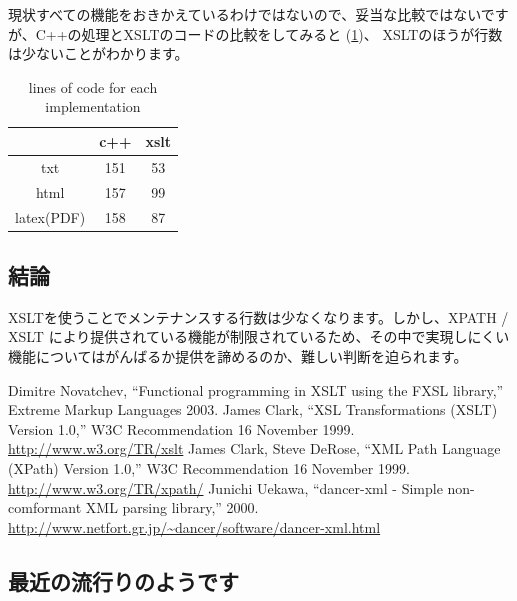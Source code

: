 \documentclass[mingoth,a4paper]{jsarticle}
\begin{document}
現状すべての機能をおきかえているわけではないので、妥当な比較ではないです
が、C++の処理とXSLTのコードの比較をしてみると
(\ref{tab:xsltcxximplementationdiff})、
XSLTのほうが行数は少ないことがわかります。

\begin{table}[ht]
 \caption{lines of code for each implementation}
 \label{tab:xsltcxximplementationdiff}
\begin{center}
  \begin{tabular}{|c|c|c|}
 \hline
 & c++ & xslt \\
 \hline
 txt & 151 & 53\\
 html & 157 & 99 \\
 latex(PDF) & 158 & 87 \\
 \hline
 \end{tabular}
\end{center}
\end{table}

\subsection{結論}

XSLTを使うことでメンテナンスする行数は少なくなります。しかし、XPATH /
XSLT により提供されている機能が制限されているため、その中で実現しにくい
機能についてはがんばるか提供を諦めるのか、難しい判断を迫られます。

\begin{thebibliography}{0}
  Dimitre Novatchev, ``Functional programming in XSLT
	 using the FXSL library,'' Extreme Markup Languages 2003.
  James Clark, ``XSL Transformations (XSLT)
	 Version 1.0,'' W3C Recommendation 16 November 1999.
	 \url{http://www.w3.org/TR/xslt}
  James Clark, Steve DeRose, ``XML Path Language
	 (XPath) Version 1.0,'' W3C Recommendation 16 November 1999.
	 \url{http://www.w3.org/TR/xpath/}
  Junichi Uekawa, ``dancer-xml - Simple
	 non-comformant XML parsing library,'' 2000.
	 \url{http://www.netfort.gr.jp/~dancer/software/dancer-xml.html}
\end{thebibliography}


\subsection{最近の流行りのようです}
\end{document}
